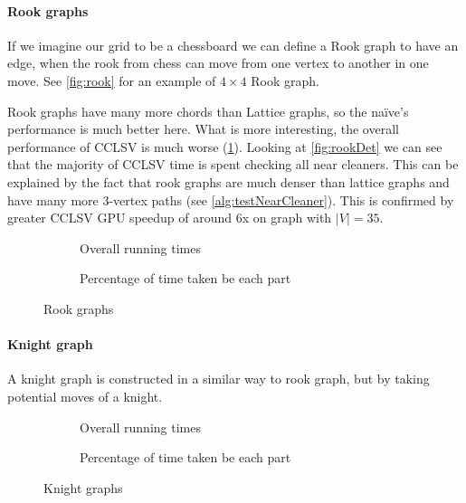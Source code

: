 \paragraph{Rook graphs}

If we imagine our grid to be a chessboard we can define a Rook graph to have an edge, when the rook from chess can move from one vertex to another in one move. See \cref{fig:rook} for an example of $4 \times 4$ Rook graph.

Rook graphs have many more chords than Lattice graphs, so the na\"ive's performance is much better here. What is more interesting, the overall performance of CCLSV is much worse (\cref{plot:rookLines}). Looking at \cref{fig:rookDet} we can see that the majority of CCLSV time is spent checking all near cleaners. This can be explained by the fact that rook graphs are much denser than lattice graphs and have many more 3-vertex paths (see \cref{alg:testNearCleaner}). This is confirmed by greater CCLSV GPU speedup of around 6x on graph with $|V| = 35$.

\begin{figure}
  \begin{subfigure}{\textwidth}
    \centering
    
    \caption{Overall running times}
    \label{plot:rookLines}
  \end{subfigure}

  \begin{subfigure}{\textwidth}
    \centering
    
    \caption{Percentage of time taken be each part}
    \label{plot:rookDet}
  \end{subfigure}
  \caption{Rook graphs}
\end{figure}

\paragraph{Knight graph}

A knight graph is constructed in a similar way to rook graph, but by taking potential moves of a knight.


\begin{figure}
  \begin{subfigure}{\textwidth}
    \centering
    
    \caption{Overall running times}
    \label{plot:knightLines}
  \end{subfigure}

  \begin{subfigure}{\textwidth}
    \centering
    
    \caption{Percentage of time taken be each part}
    \label{plot:knightDet}
  \end{subfigure}
  \caption{Knight graphs}
\end{figure}


